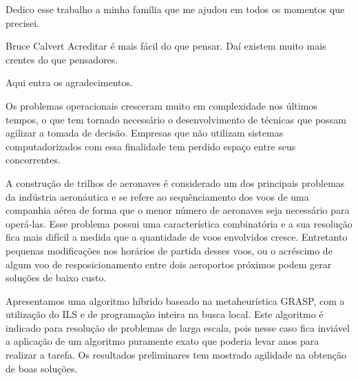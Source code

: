 \documentclass[oneside,normaltoc,espacoumemeio,PGTEXdissertacao]{pgeeltex}
\begin{document}


\folhaderostoPGTEX
\folhadeaprovacaoPGTEX

%
\begin{dedicatoriaPGTEX}
Dedico esse trabalho a minha família que me ajudou em todos os momentos
que precisei.
\end{dedicatoriaPGTEX}




\begin{epigrafePGTEX}{Bruce Calvert} 
Acreditar é mais fácil do que pensar. Daí existem muito mais crentes do que
pensadores.
\end{epigrafePGTEX}


\begin{agradecimentosPGTEX}
Aqui entra os agradecimentos.
\end{agradecimentosPGTEX}

\begin{resumoPGTEX}
Os problemas operacionais cresceram muito em complexidade nos últimos
tempos, o que tem tornado necessário o desenvolvimento de técnicas que possam agilizar a tomada de decisão. Empresas que não utilizam sistemas 
computadorizados com essa finalidade tem perdido espaço entre seus concorrentes.
 
 A construção de trilhos de aeronaves é considerado um dos principais problemas da indústria aeronáutica e se 
 refere ao sequênciamento dos voos de uma companhia aérea de forma que o menor número de aeronaves seja necessário 
 para operá-las. Esse problema possui uma característica combinatória e a sua
 resolução fica mais difícil a medida que a quantidade de voos envolvidos cresce. Entretanto pequenas modificações nos horários de partida desses voos, 
 ou o acréscimo de algum voo de resposicionamento entre dois aeroportos próximos podem gerar soluções de baixo custo.
 
 Apresentamos uma algoritmo híbrido baseado na metaheurística GRASP, com a utilização do ILS e de programação inteira 
 na busca local. Este algoritmo é indicado para resolução de problemas de larga
 escala, pois nesse caso fica inviável a aplicação de um algoritmo puramente exato que poderia levar anos para realizar a tarefa. Os resultados preliminares 
 tem mostrado agilidade na obtenção de boas soluções.
 
 \\
 
 \end{resumoPGTEX}
\end{document}
